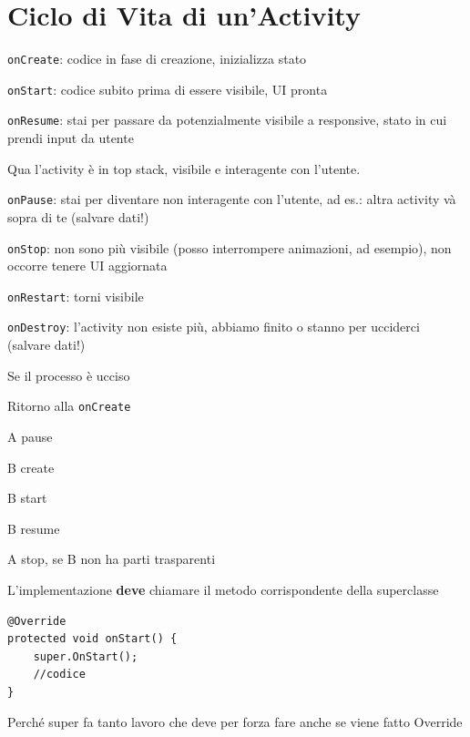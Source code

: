 \documentclass[10pt]{book}
\begin{document}
\section{Ciclo di Vita di un'Activity}
\begin{list}{}{Fase di avvio}
	\item \texttt{onCreate}: codice in fase di creazione, inizializza stato
	\item \texttt{onStart}: codice subito prima di essere visibile, UI pronta
	\item \texttt{onResume}: stai per passare da potenzialmente visibile a responsive, stato in cui prendi input da utente
\end{list}
Qua l'activity è in top stack, visibile e interagente con l'utente.
\begin{list}{}{}
	\item \texttt{onPause}: stai per diventare non interagente con l'utente, ad es.: altra activity và sopra di te (salvare dati!)
	\item \texttt{onStop}: non sono più visibile (posso interrompere animazioni, ad esempio), non occorre tenere UI aggiornata
	\item \texttt{onRestart}: torni visibile
	\item \texttt{onDestroy}: l'activity non esiste più, abbiamo finito o stanno per ucciderci (salvare dati!)
\end{list}
Se il processo è ucciso
\begin{list}{}{}
	\item Ritorno alla \texttt{onCreate}
\end{list}
\begin{list}{}{Da A a B}
	\item A pause
	\item B create
	\item B start
	\item B resume
	\item A stop, se B non ha parti trasparenti
\end{list}
L'implementazione \textbf{deve} chiamare il metodo corrispondente della superclasse
\begin{verbatim}
@Override
protected void onStart() {
	super.OnStart();
	//codice
}
\end{verbatim}
Perché super fa tanto lavoro che deve per forza fare anche se viene fatto Override
\end{document}
